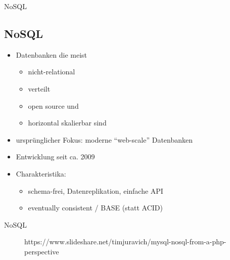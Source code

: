 \documentclass[11pt]{beamer}
\begin{document}
\begin{frame}{NoSQL}
\subsection{NoSQL}
\begin{itemize}


\item Datenbanken die meist
\begin{itemize}
\item nicht-relational
\item verteilt
\item open source und
\item horizontal skalierbar sind
\end{itemize}

\item ursprünglicher Fokus: moderne “web-scale” Datenbanken
\item Entwicklung seit ca. 2009 
\item Charakteristika:
\begin{itemize}
\item schema-frei, Datenreplikation, einfache API
\item eventually consistent / BASE (statt ACID)
\end{itemize}

\end{itemize}

\end{frame}

\begin{frame}{NoSQL}
\begin{figure}
		\caption{https://www.slideshare.net/timjuravich/mysql-nosql-from-a-php-perspective}
\end{figure}
\end{frame}
\end{document}
